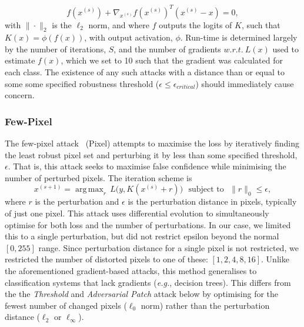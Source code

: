 \documentclass[journal]{IEEEtran}
\DeclareMathOperator*{\argmax}{arg\,max}
\begin{document}
$$
f(x^{(s)}) + \nabla_{x^{(s)}} f{{(x^{(s)})}^T(x^{(s)} - x)} = 0,
$$
with $\|\cdot\|_2$ is the $\ell_2$ norm, and where $f$ outputs the logits of $K$, such that $K(x) = \phi(f(x))$, with output activation, $\phi$.
Run-time is determined largely by the number of iterations, $S$, and the number of gradients $w.r.t.~L(x)$ used to estimate $f(x)$, which we set to 10 such that the gradient was calculated for each class.
The existence of any such attacks with a distance than or equal to some some specified robustness threshold ($\epsilon \leq \epsilon_{critical}$) should immediately cause concern.

\subsubsection{Few-Pixel}

The few-pixel attack~\cite{pixelattack} (Pixel) attempts to maximise the loss by iteratively finding the least robust pixel set and perturbing it by less than some specified threshold, $\epsilon$.
That is, this attack seeks to maximise false confidence while minimising the number of perturbed pixels.
The iteration scheme is
$$
    x^{(s+1)} = \argmax_r \, L\big(y, K(x^{(s)} + r)\big) \text{~~subject~to~~}  \|r\|_0 \leq \epsilon,
$$
where $r$ is the perturbation and $\epsilon$ is the perturbation distance in pixels, typically of just one pixel.
This attack uses differential evolution to simultaneously optimise for both loss and the number of perturbations.
In our case, we limited this to a single perturbation, but did not restrict epsilon beyond the normal $[0, 255]$ range.
Since perturbation distance for a single pixel is not restricted, we restricted the number of distorted pixels to one of these: $[1,2,4,8, 16]$.
Unlike the aforementioned gradient-based attacks, this method generalises to classification systems that lack gradients (\textit{e.g.}, decision trees).
This differs from the the \textit{Threshold} and \textit{Adversarial Patch} attack below by optimising for the fewest number of changed pixels ($\ell_0$ norm) rather than the perturbation distance ($\ell_2$ or $\ell_{\infty}$).
\end{document}
